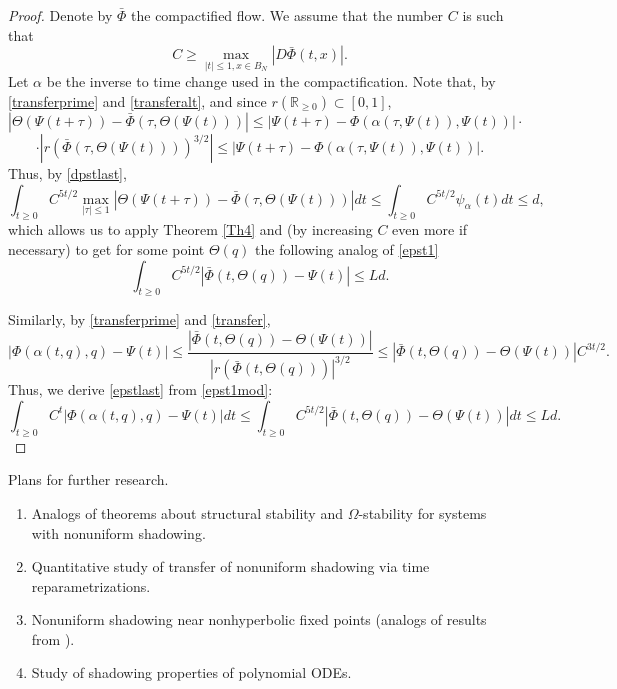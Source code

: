 \documentclass[11pt]{article}
\theoremstyle{Mystyle}
\begin{document}
\begin{proof}
Denote by $\bar{\Phi}$ the compactified flow. We assume that the number $C$ is such that
$$C\geq\max_{|t|\leq 1,x\in B_N{}}|D\bar{\Phi}(t,x)|.$$
Let $\alpha$ be the inverse to time change used in the compactification.
Note that, by \eqref{transferprime} and \eqref{transferalt}, and since $r(\mathbb{R}_{\geq0})\subset [0,1]$,  
$$|\Theta(\Psi(t+\tau)) - \bar{\Phi}(\tau,\Theta(\Psi(t)))| \leq 
|\Psi(t+\tau) - \Phi(\alpha(\tau,\Psi(t)),\Psi(t))|\cdot$$
$$\cdot|r(\bar{\Phi}(\tau,\Theta(\Psi(t))))^{3/2}|
\leq |\Psi(t+\tau) - \Phi(\alpha(\tau,\Psi(t)),\Psi(t))|.$$
Thus, by \eqref{dpstlast},
$$\int_{t\geq 0}C^{5t/2}\max_{|\tau|\leq 1}|\Theta(\Psi(t+\tau)) - \bar{\Phi}(\tau,\Theta(\Psi(t)))| dt\leq \int_{t\geq 0}C^{5t/2}\psi_{\alpha}(t)dt\leq d,$$
which allows us to apply Theorem \ref{Th4} and (by increasing $C$ even more if necessary) to get for some point $\Theta(q)$ the following analog of \eqref{epst1}
\begin{equation}
\label{epst1mod}
\int_{t\geq 0}C^{5t/2}|\bar{\Phi}(t,\Theta(q)) - \Psi(t)|\leq Ld.
\end{equation}

Similarly, by \eqref{transferprime} and \eqref{transfer},
$$|\Phi(\alpha(t,q),q) - \Psi(t)|\leq \frac{|\bar{\Phi}(t,\Theta(q)) - \Theta(\Psi(t))|}{|r(\bar{\Phi}(t,\Theta(q)))|^{3/2}}\leq |\bar{\Phi}(t,\Theta(q)) - \Theta(\Psi(t))|C^{3t/2}.$$
Thus, we derive \eqref{epstlast} from \eqref{epst1mod}:
$$\int_{t\geq 0} C^{t}|\Phi(\alpha(t,q),q) - \Psi(t)|dt \leq
\int_{t\geq 0} C^{5t/2} |\bar{\Phi}(t,\Theta(q)) - \Theta(\Psi(t))| dt\leq Ld.$$

\end{proof}

\begin{section}{Plans for further research.}

\begin{enumerate}
	\item Analogs of theorems about structural stability and $\Omega$-stability for systems with nonuniform shadowing.
	\item Quantitative study of transfer of nonuniform shadowing via time reparametrizations.
	\item Nonuniform shadowing near nonhyperbolic fixed points (analogs of results from \cite{PP}).
	\item Study of shadowing properties of polynomial ODEs.
\end{enumerate}

\end{section}
\end{document}
